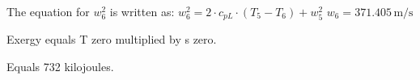 The equation for \( w_6^2 \) is written as:  
\( w_6^2 = 2 \cdot c_{pL} \cdot (T_5 - T_6) + w_5^2 \)  
\( w_6 = 371.405 \, \text{m/s} \)

Exergy equals T zero multiplied by s zero.  

Equals 732 kilojoules.